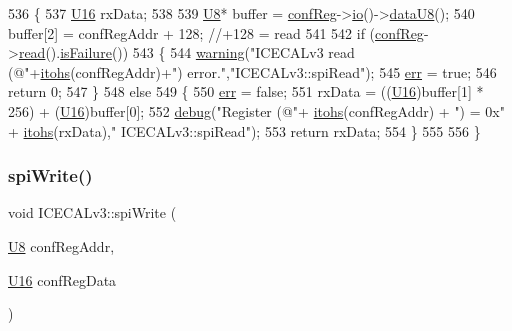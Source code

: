 \begin{DoxyCode}
536 \{
537     \hyperlink{ICECALv3_8h_adf928e51a60dba0df29d615401cc55a8}{U16} rxData;
538 
539     \hyperlink{ICECALv3_8h_a3cb25ca6f51f003950f9625ff05536fc}{U8}* buffer = \hyperlink{classICECALv3_a6e8b6c03f5b0f1d8281bf8a0fa46064f}{confReg}->\hyperlink{classIOobject_af04fb94137c3d86849f478ac5afab5d1}{io}()->\hyperlink{classIOdata_a75e9c318dbac3a39402179070943d4bc}{dataU8}();
540     buffer[2]  = confRegAddr + 128;                         \textcolor{comment}{//+128 = read   }
541 
542     \textcolor{keywordflow}{if} (\hyperlink{classICECALv3_a6e8b6c03f5b0f1d8281bf8a0fa46064f}{confReg}->\hyperlink{classIOobject_aa07610c11963b1db6710e3c76ceea456}{read}().\hyperlink{classStatusCode_a5dd22dc6eb2c52fc4cabc58f6dea2eb7}{isFailure}()) 
543     \{
544         \hyperlink{classObject_a65cd4fda577711660821fd2cd5a3b4c9}{warning}(\textcolor{stringliteral}{"ICECALv3 read (@"}+\hyperlink{classICECALv3_a04b02e583f191bfce34d05132cd23834}{itohs}(confRegAddr)+\textcolor{stringliteral}{") error."},\textcolor{stringliteral}{"ICECALv3::spiRead"});
545         \hyperlink{classICECALv3_ad8989925ee5b3ff322d863ce6aaff0bd}{err} = \textcolor{keyword}{true};
546         \textcolor{keywordflow}{return} 0;
547     \}
548     \textcolor{keywordflow}{else}
549     \{
550         \hyperlink{classICECALv3_ad8989925ee5b3ff322d863ce6aaff0bd}{err} = \textcolor{keyword}{false};
551         rxData = ((\hyperlink{ICECALv3_8h_adf928e51a60dba0df29d615401cc55a8}{U16})buffer[1] * 256) + (\hyperlink{ICECALv3_8h_adf928e51a60dba0df29d615401cc55a8}{U16})buffer[0];
552         \hyperlink{classObject_aac010553f022165573714b7014a15f0d}{debug}(\textcolor{stringliteral}{"Register (@"}+ \hyperlink{classICECALv3_a04b02e583f191bfce34d05132cd23834}{itohs}(confRegAddr) + \textcolor{stringliteral}{") = 0x"} + \hyperlink{classICECALv3_a04b02e583f191bfce34d05132cd23834}{itohs}(rxData),\textcolor{stringliteral}{"
      ICECALv3::spiRead"});
553         \textcolor{keywordflow}{return} rxData;
554     \}
555 
556 \}
\end{DoxyCode}
\mbox{\label{classICECALv3_aef00f02801dea4bda2093c930501dcdd}} 
\subsubsection{\texorpdfstring{spi\+Write()}{spiWrite()}}
{\footnotesize\ttfamily void I\+C\+E\+C\+A\+Lv3\+::spi\+Write (\begin{DoxyParamCaption}\item[{\hyperlink{ICECALv3_8h_a3cb25ca6f51f003950f9625ff05536fc}{U8}}]{conf\+Reg\+Addr,  }\item[{\hyperlink{ICECALv3_8h_adf928e51a60dba0df29d615401cc55a8}{U16}}]{conf\+Reg\+Data }\end{DoxyParamCaption})\hspace{0.3cm}{\ttfamily [private]}}



